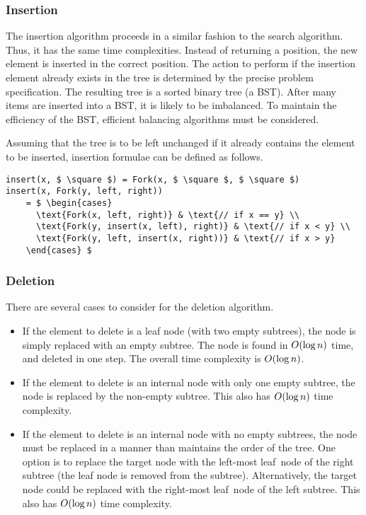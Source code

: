 \subsubsection{Insertion}

The insertion algorithm proceeds in a similar fashion to the search algorithm.
Thus, it has the same time complexities.
Instead of returning a position, the new element is inserted in the correct position.
The action to perform if the insertion element already exists in the tree is determined by the precise problem specification.
The resulting tree is a sorted binary tree (a BST).
After many items are inserted into a BST, it is likely to be imbalanced.
To maintain the efficiency of the BST, efficient balancing algorithms must be considered.

Assuming that the tree is to be left unchanged if it already contains the element to be inserted, insertion formulae can be defined as follows.
\begin{lstlisting}[mathescape=true]
insert(x, $ \square $) = Fork(x, $ \square $, $ \square $)
insert(x, Fork(y, left, right))
    = $ \begin{cases}
      \text{Fork(x, left, right)} & \text{// if x == y} \\
      \text{Fork(y, insert(x, left), right)} & \text{// if x < y} \\
      \text{Fork(y, left, insert(x, right))} & \text{// if x > y}
    \end{cases} $
\end{lstlisting}

\subsubsection{Deletion}

There are several cases to consider for the deletion algorithm.
\begin{itemize}
  \item If the element to delete is a leaf node (with two empty subtrees), the node is simply replaced with an empty subtree.
  The node is found in \( O\!\left(\log n\right) \) time, and deleted in one step.
  The overall time complexity is \( O\!\left(\log n\right) \).
  \item If the element to delete is an internal node with only one empty subtree, the node is replaced by the non-empty subtree.
  This also has \( O\!\left(\log n\right) \) time complexity.
  \item If the element to delete is an internal node with no empty subtrees, the node must be replaced in a manner than maintains the order of the tree.
  One option is to replace the target node with the left-most leaf~node of the right subtree (the leaf node is removed from the subtree).
  Alternatively, the target node could be replaced with the right-most leaf~node of the left subtree.
  This also has \( O\!\left(\log n\right) \) time complexity.
\end{itemize}

